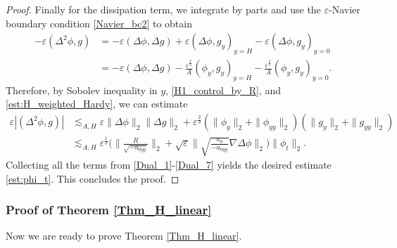 \documentclass[reqno, 11pt]{amsart}
\theoremstyle{plain}
\theoremstyle{definition}
\theoremstyle{remark}
\numberwithin{equation}{section}
\begin{document}
\begin{proof}
Finally for the dissipation term, we integrate by parts and use the $\varepsilon$-Navier boundary condition \eqref{Navier_bc2} to obtain
\begin{equation*}
\begin{aligned}
-\varepsilon(\Delta^2 \phi, g) &= - \varepsilon (\Delta \phi, \Delta g) + \varepsilon (\Delta \phi, g_y)_{y = H} - \varepsilon (\Delta \phi, g_y)_{y = 0}\\
&= - \varepsilon (\Delta \phi, \Delta g) - \frac{\varepsilon^{\frac{2}{3}}}{A} ( \phi_y, g_y)_{y = H} - \frac{\varepsilon^{\frac{2}{3}}}{A} ( \phi_y, g_y)_{y = 0}.
\end{aligned}
\end{equation*}
Therefore, by Sobolev inequality in $y$, \eqref{H1_control_by_R}, and \eqref{est:H_weighted_Hardy}, we can estimate
\begin{equation}\label{Dual_7}
\begin{aligned}
\varepsilon|(\Delta^2 \phi, g)| &\lesssim_{A,H} \varepsilon \| \Delta\phi\|_2\|\Delta g\|_2 + \varepsilon^{\frac{2}{3}} (\| \phi_y\|_2 + \| \phi_{yy}\|_2) (\|g_y\|_2 + \| g_{yy}\|_2)\\
&\lesssim_{A,H} \varepsilon^{\frac{1}{3}}  \Big( \|\frac{R}{\sqrt{-u_{0yy}}}\|_2 + \sqrt{\varepsilon} \| \sqrt{\frac{u_0}{-u_{0yy}}} \nabla \Delta \phi\|_2\Big) \|\phi_t\|_2.
\end{aligned}
\end{equation}
Collecting all the terms from \eqref{Dual_1}-\eqref{Dual_7} yields the desired estimate \eqref{est:phi_t}. This concludes the proof.
\end{proof}

\subsubsection{Proof of Theorem \ref{Thm_H_linear}}

Now we are ready to prove Theorem \ref{Thm_H_linear}.
\end{document}
